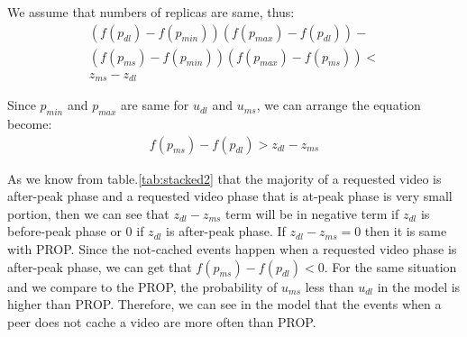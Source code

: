 \documentclass[10pt,final,journal,a4paper]{IEEEtran}
\begin{document}
We assume that numbers of replicas are same, thus:
\begin{multline}\label{eq:dlms_3}
(f(p_{dl}) - f(p_{min})) (f(p_{max}) - f(p_{dl})) - \\ 
(f(p_{ms}) - f(p_{min})) (f(p_{max}) - f(p_{ms})) < \\
z_{ms} - z_{dl}
\end{multline}

Since $p_{min}$ and $p_{max}$ are same for $u_{dl}$ and $u_{ms}$, we can arrange the equation become:
\begin{align}\label{eq:dlms_4}
f(p_{ms}) - f(p_{dl}) > z_{dl} - z_{ms}
\end{align}


As we know from table.\ref{tab:stacked2} that the majority of a requested video is after-peak phase and a requested video phase that is  at-peak phase is very small portion, then we can see that $z_{dl} - z_{ms}$ term will be in negative term if $z_{dl}$ is  before-peak phase or $0$ if $z_{dl}$ is  after-peak phase. 
If $z_{dl} - z_{ms}=0$ then it is same with PROP. 
Since the not-cached events happen when a requested video phase is after-peak phase, we can get that $f(p_{ms}) - f(p_{dl}) < 0$.
For the same situation and we compare to the PROP, the probability of $u_{ms}$ less than $u_{dl}$ in the model is higher than PROP. 
Therefore, we can see in the model that the events when a peer does not cache a video are more often than PROP.


\end{document}
